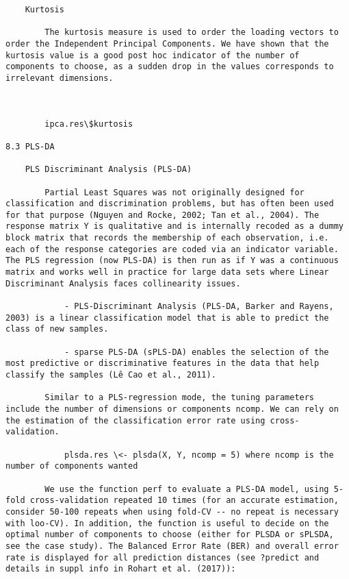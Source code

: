 \documentclass[
]{book}
\begin{document}
\begin{verbatim}
    Kurtosis

        The kurtosis measure is used to order the loading vectors to order the Independent Principal Components. We have shown that the kurtosis value is a good post hoc indicator of the number of components to choose, as a sudden drop in the values corresponds to irrelevant dimensions.



        ipca.res\$kurtosis

8.3 PLS-DA

    PLS Discriminant Analysis (PLS-DA)

        Partial Least Squares was not originally designed for classification and discrimination problems, but has often been used for that purpose (Nguyen and Rocke, 2002; Tan et al., 2004). The response matrix Y is qualitative and is internally recoded as a dummy block matrix that records the membership of each observation, i.e. each of the response categories are coded via an indicator variable. The PLS regression (now PLS-DA) is then run as if Y was a continuous matrix and works well in practice for large data sets where Linear Discriminant Analysis faces collinearity issues.

            - PLS-Discriminant Analysis (PLS-DA, Barker and Rayens, 2003) is a linear classification model that is able to predict the class of new samples.

            - sparse PLS-DA (sPLS-DA) enables the selection of the most predictive or discriminative features in the data that help classify the samples (Lê Cao et al., 2011).

        Similar to a PLS-regression mode, the tuning parameters include the number of dimensions or components ncomp. We can rely on the estimation of the classification error rate using cross-validation.

            plsda.res \<- plsda(X, Y, ncomp = 5) where ncomp is the number of components wanted

        We use the function perf to evaluate a PLS-DA model, using 5-fold cross-validation repeated 10 times (for an accurate estimation, consider 50-100 repeats when using fold-CV -- no repeat is necessary with loo-CV). In addition, the function is useful to decide on the optimal number of components to choose (either for PLSDA or sPLSDA, see the case study). The Balanced Error Rate (BER) and overall error rate is displayed for all prediction distances (see ?predict and details in suppl info in Rohart et al. (2017)):


\end{verbatim}
\end{document}

